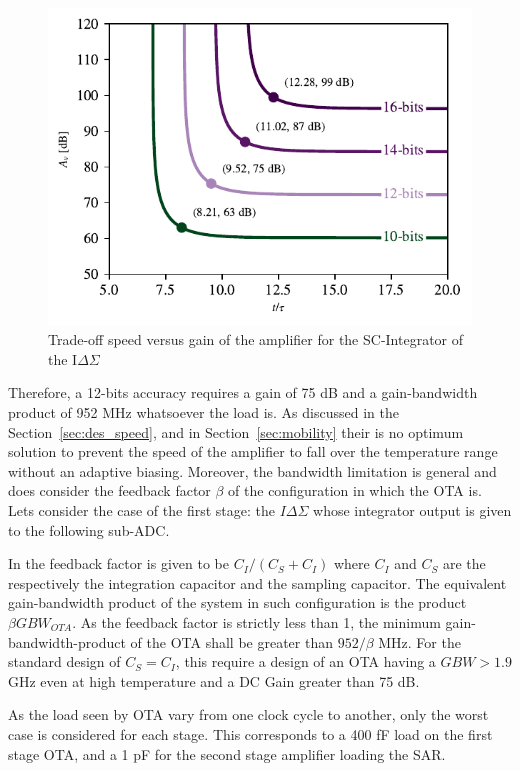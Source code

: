 \begin{figure}[htp]
    \centering
    \includegraphics[width=.75\textwidth]{Chapter7/Figs/ota_spec.pdf}
    \caption{Trade-off speed versus gain of the amplifier for the SC-Integrator of the I\(\Delta\Sigma \)}
    \label{fig:ota_spec_tradeoffs}
\end{figure}

Therefore, a 12-bits accuracy requires a gain of 75 dB and a gain-bandwidth product of 952 MHz whatsoever the load is. As discussed in the Section~\ref{sec:des_speed}, and in Section~\ref{sec:mobility} their is no optimum solution to prevent the speed of the amplifier to fall over the temperature range without an adaptive biasing. Moreover, the bandwidth limitation is general and does consider the feedback factor \(\beta \) of the configuration in which the OTA is. Lets consider the case of the first stage: the \(I\Delta\Sigma \) whose integrator output is given to the following sub-ADC\@.

In the feedback factor is given to be \(C_I/(C_S+C_I) \) where \(C_I\) and \(C_S\) are the respectively the integration capacitor and the sampling capacitor. The equivalent gain-bandwidth product of the system in such configuration is the product \(\beta GBW_{OTA}\). As the feedback factor is strictly less than 1, the minimum gain-bandwidth-product of the OTA shall be greater than \(952/\beta \) MHz. For the standard design of \(C_S = C_I \), this require a design of an OTA having a \(GBW > 1.9 \) GHz even at high temperature and a DC Gain greater than 75 dB.

As the load seen by OTA vary from one clock cycle to another, only the worst case is considered for each stage. This corresponds to a 400 fF load on the first stage OTA, and a 1 pF for the second stage amplifier loading the SAR\@.


